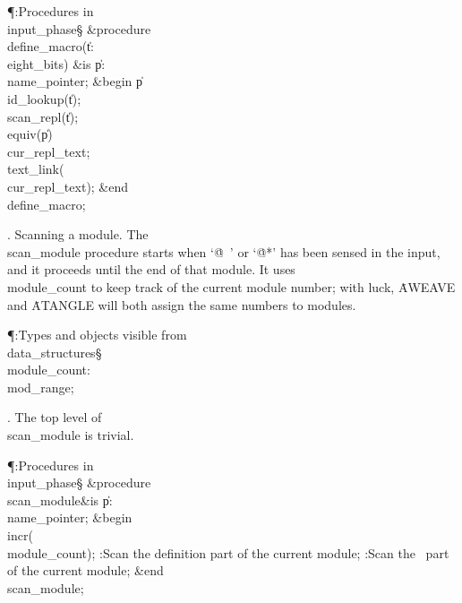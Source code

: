 \Y\P\?\4:Procedures in \\{input\_phase}\X\mathrel{+}\S\?\6
\&{procedure}\8\1\\{define\_macro}\?(\1\?\|t\?:\?\\{eight\_bits}\?\2)\?\2\8%
\&{is}\8\1\6
\|p\?:\?\\{name\_pointer};\6
\4\&{begin}\6
\|p\?\K\?\\{id\_lookup}\?\1(\?\|t\?\2)\?;\5
\\{scan\_repl}\?\1(\?\|t\?\2)\?;\6
\\{equiv}\?\1(\?\|p\?\2)\K\?\\{cur\_repl\_text};\5
\\{text\_link}\?\1(\?\\{cur\_repl\_text}\?\2)\K{};\2\6
\&{end}\8\\{define\_macro};\par
\fi

.  Scanning a module.
The \\{scan\_module} procedure starts when `\.{@\ }' or `\.{@*}' has been
sensed in the input, and it proceeds until the end of that module.  It
uses \\{module\_count} to keep track of the current module number; with luck,
\.{AWEAVE} and \.{ATANGLE} will both assign the same numbers to modules.

\Y\P\?\4:Types and objects visible from \\{data\_structures}\X\mathrel{+}\S%
\?\6
\\{module\_count}\?:\?\\{mod\_range};\par
\fi

. The top level of \\{scan\_module} is trivial.

\Y\P\?\4:Procedures in \\{input\_phase}\X\mathrel{+}\S\?\6
\&{procedure}\8\1\\{scan\_module}\2\8\&{is}\8\1\6
\|p\?:\?\\{name\_pointer};\6
\4\&{begin}\6
\\{incr}\?\1(\?\\{module\_count}\?\2)\?;\6
:Scan the definition part of the current module\X;\6
:Scan the \ADA\ part of the current module\X;\2\6
\&{end}\8\\{scan\_module};\par
\fi

